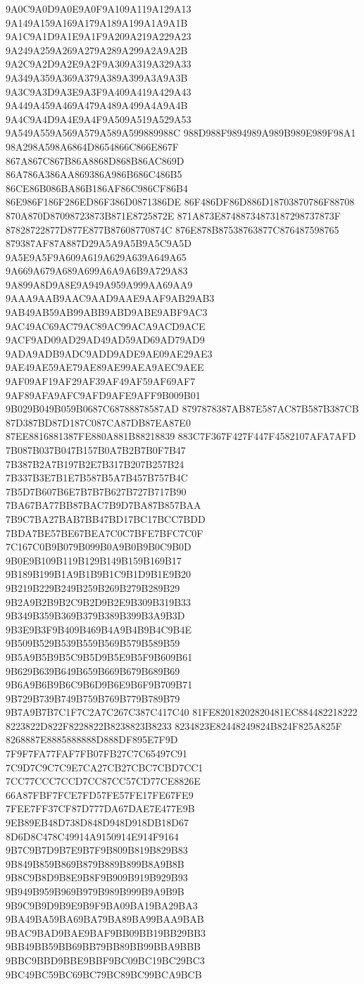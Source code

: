 9A0C9A0D9A0E9A0F9A109A119A129A13
9A149A159A169A179A189A199A1A9A1B
9A1C9A1D9A1E9A1F9A209A219A229A23
9A249A259A269A279A289A299A2A9A2B
9A2C9A2D9A2E9A2F9A309A319A329A33
9A349A359A369A379A389A399A3A9A3B
9A3C9A3D9A3E9A3F9A409A419A429A43
9A449A459A469A479A489A499A4A9A4B
9A4C9A4D9A4E9A4F9A509A519A529A53
9A549A559A569A579A589A599889988C
988D988F9894989A989B989E989F98A1
98A298A598A6864D8654866C866E867F
867A867C867B86A8868D868B86AC869D
86A786A386AA869386A986B686C486B5
86CE86B086BA86B186AF86C986CF86B4
86E986F186F286ED86F386D0871386DE
86F486DF86D886D18703870786F88708
870A870D87098723873B871E8725872E
871A873E87488734873187298737873F
87828722877D877E877B87608770874C
876E878B87538763877C876487598765
879387AF87A887D29A5A9A5B9A5C9A5D
9A5E9A5F9A609A619A629A639A649A65
9A669A679A689A699A6A9A6B9A729A83
9A899A8D9A8E9A949A959A999AA69AA9
9AAA9AAB9AAC9AAD9AAE9AAF9AB29AB3
9AB49AB59AB99ABB9ABD9ABE9ABF9AC3
9AC49AC69AC79AC89AC99ACA9ACD9ACE
9ACF9AD09AD29AD49AD59AD69AD79AD9
9ADA9ADB9ADC9ADD9ADE9AE09AE29AE3
9AE49AE59AE79AE89AE99AEA9AEC9AEE
9AF09AF19AF29AF39AF49AF59AF69AF7
9AF89AFA9AFC9AFD9AFE9AFF9B009B01
9B029B049B059B0687C68788878587AD
8797878387AB87E587AC87B587B387CB
87D387BD87D187C087CA87DB87EA87E0
87EE8816881387FE880A881B88218839
883C7F367F427F447F4582107AFA7AFD
7B087B037B047B157B0A7B2B7B0F7B47
7B387B2A7B197B2E7B317B207B257B24
7B337B3E7B1E7B587B5A7B457B757B4C
7B5D7B607B6E7B7B7B627B727B717B90
7BA67BA77BB87BAC7B9D7BA87B857BAA
7B9C7BA27BAB7BB47BD17BC17BCC7BDD
7BDA7BE57BE67BEA7C0C7BFE7BFC7C0F
7C167C0B9B079B099B0A9B0B9B0C9B0D
9B0E9B109B119B129B149B159B169B17
9B189B199B1A9B1B9B1C9B1D9B1E9B20
9B219B229B249B259B269B279B289B29
9B2A9B2B9B2C9B2D9B2E9B309B319B33
9B349B359B369B379B389B399B3A9B3D
9B3E9B3F9B409B469B4A9B4B9B4C9B4E
9B509B529B539B559B569B579B589B59
9B5A9B5B9B5C9B5D9B5E9B5F9B609B61
9B629B639B649B659B669B679B689B69
9B6A9B6B9B6C9B6D9B6E9B6F9B709B71
9B729B739B749B759B769B779B789B79
9B7A9B7B7C1F7C2A7C267C387C417C40
81FE82018202820481EC884482218222
8223822D822F8228822B8238823B8233
8234823E82448249824B824F825A825F
8268887E8885888888D888DF895E7F9D
7F9F7FA77FAF7FB07FB27C7C65497C91
7C9D7C9C7C9E7CA27CB27CBC7CBD7CC1
7CC77CCC7CCD7CC87CC57CD77CE8826E
66A87FBF7FCE7FD57FE57FE17FE67FE9
7FEE7FF37CF87D777DA67DAE7E477E9B
9EB89EB48D738D848D948D918DB18D67
8D6D8C478C49914A9150914E914F9164
9B7C9B7D9B7E9B7F9B809B819B829B83
9B849B859B869B879B889B899B8A9B8B
9B8C9B8D9B8E9B8F9B909B919B929B93
9B949B959B969B979B989B999B9A9B9B
9B9C9B9D9B9E9B9F9BA09BA19BA29BA3
9BA49BA59BA69BA79BA89BA99BAA9BAB
9BAC9BAD9BAE9BAF9BB09BB19BB29BB3
9BB49BB59BB69BB79BB89BB99BBA9BBB
9BBC9BBD9BBE9BBF9BC09BC19BC29BC3
9BC49BC59BC69BC79BC89BC99BCA9BCB

